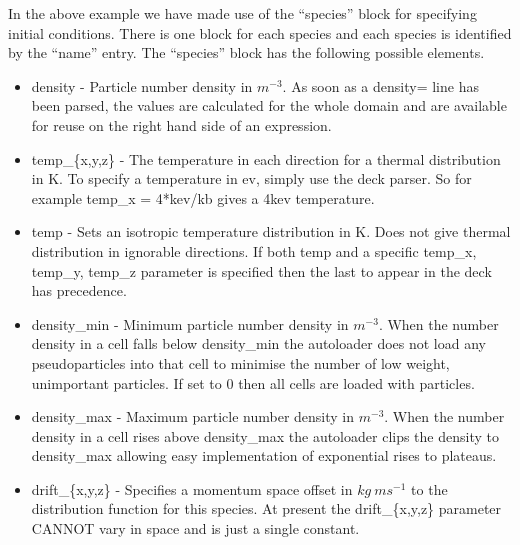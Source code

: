 In the above example we have made use of the ``species'' block for specifying
initial conditions. There is one block for each species
and each species is identified by the ``name'' entry.
The ``species'' block has the following possible elements.
\begin{itemize}
\item density - Particle number density in $m^{-3}$. 
  As soon as a density= line has been parsed, the values are
  calculated for the whole domain and are available for reuse on the right hand
  side of an expression.
\item temp\_\{x,y,z\} - The temperature in each direction for a thermal
  distribution in K. To specify a temperature in ev, simply use the deck
  parser. So for example temp\_x = 4*kev/kb gives a 4kev temperature.
\item temp - Sets an isotropic temperature distribution in K. Does not give
  thermal distribution in ignorable directions. If both temp and a specific
  temp\_x, temp\_y, temp\_z parameter is specified then the last to appear in
  the deck has precedence.
\item density\_min - Minimum particle number density in $m^{-3}$.
  When the number density in a cell falls below density\_min the
  autoloader does not load any
  pseudoparticles into that cell to minimise the number of low weight,
  unimportant particles. If set to 0 then all cells are loaded with particles.
\item density\_max - Maximum particle number density in $m^{-3}$. When
  the number density in a cell rises above density\_max the autoloader
  clips the density to density\_max allowing easy implementation of
  exponential rises to plateaus.
\item drift\_\{x,y,z\} - Specifies a momentum space offset in $kg\ ms^{-1}$ to
  the distribution function for this species. At present the drift\_\{x,y,z\}
  parameter CANNOT vary in space and is just a single constant.
\end{itemize}

